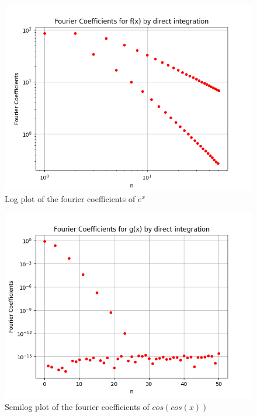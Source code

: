 \documentclass[11pt, a4paper]{article}
\begin{document}
	\begin{figure}[!tbh]
   	\centering
   	\includegraphics[scale=0.6]{Figure5.png}   
   	\caption{Log plot of the fourier coefficients of $e^{x}$}
   	\label{fig:sample}
   \end{figure} 
   
	\begin{figure}[!tbh]
   	\centering
   	\includegraphics[scale=0.6]{Figure6.png}   
   	\caption{Semilog plot of the fourier coefficients of $cos(cos(x))$}
   	\label{fig:sample}
   \end{figure} 
\end{document}

